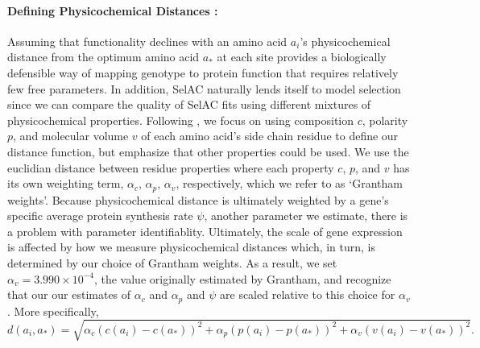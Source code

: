 \documentclass{article}
\newcommand{\selac}{SelAC\xspace}
\newcommand{\alphac}{\ensuremath{\alpha_c}\xspace}
\newcommand{\alphap}{\ensuremath{\alpha_p}\xspace}
\newcommand{\alphav}{\ensuremath{\alpha_v}\xspace}
\newcommand{\aopt}{\ensuremath{a_*}\xspace}
\begin{document}
\paragraph*{Defining Physicochemical Distances :}
Assuming that functionality declines with an amino acid $a_i$'s physicochemical distance from the optimum amino acid \aopt at each site provides a biologically defensible way of mapping genotype to protein function that requires relatively few free parameters.
In addition, \selac naturally lends itself to model selection since we can compare the quality of \selac fits using different mixtures of physicochemical properties.
Following \cite{Grantham1974}, we focus on using composition $c$, polarity $p$, and molecular volume $v$ of each amino acid's side chain residue to define our distance function, but emphasize that other properties could be used.
We use the euclidian distance between residue properties where each property $c$, $p$, and $v$ has its own weighting term, $\alphac$, $\alphap$, $\alphav$, respectively, which we refer to as `Grantham weights'.
Because physicochemical distance is ultimately weighted by a gene's specific average protein synthesis rate $\psi$, another parameter we estimate, there is a problem with parameter identifiablity.
Ultimately, the scale of gene expression is affected by how we measure physicochemical distances which, in turn, is determined by our choice of Grantham weights.
As a result, we set $\alphav = 3.990 \times 10^{-4}$, the value originally estimated by Grantham, and recognize that our our estimates of $\alphac$ and $\alphap$ and $\psi$ are scaled relative to this choice for $\alphav$.
More specifically,
\begin{equation*}
  d(a_i, \aopt) = \sqrt{\alphac \left(c\left(a_i\right) - c\left(\aopt\right)\right)^2 + \alphap \left(p\left(a_i\right) - p\left(\aopt\right)\right)^2 +  \alphav \left(v\left(a_i\right) - v\left(\aopt\right)\right)^2}.
\end{equation*}
\end{document}
